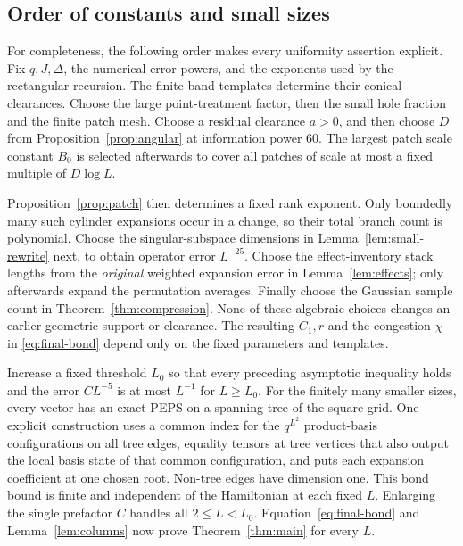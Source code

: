\subsection{Order of constants and small sizes}

For completeness, the following order makes every uniformity assertion
explicit. Fix $q,J,\Delta$, the numerical error powers, and the exponents
used by the rectangular recursion. The finite band templates determine
their conical clearances. Choose the large point-treatment factor, then
the small hole fraction and the finite patch mesh. Choose a residual
clearance $a>0$, and then choose $D$ from
Proposition~\ref{prop:angular} at information power $60$.
The largest patch scale constant $B_0$ is selected afterwards to cover
all patches of scale at most a fixed multiple of $D\log L$.

Proposition~\ref{prop:patch} then determines a fixed rank exponent.
Only boundedly many such cylinder expansions occur in a change, so their
total branch count is polynomial. Choose the singular-subspace dimensions
in Lemma~\ref{lem:small-rewrite} next, to obtain operator error
$L^{-25}$. Choose the effect-inventory stack lengths from the
\emph{original} weighted expansion error in Lemma~\ref{lem:effects};
only afterwards expand the permutation averages. Finally choose the
Gaussian sample count in Theorem~\ref{thm:compression}. None of these
algebraic choices changes an earlier geometric support or clearance.
The resulting $C_1,r$ and the congestion $\chi$ in
\eqref{eq:final-bond} depend only on the fixed parameters and templates.

Increase a fixed threshold $L_0$ so that every preceding asymptotic
inequality holds and the error $CL^{-5}$ is at most $L^{-1}$ for
$L\ge L_0$. For the finitely many smaller sizes, every vector has an exact
PEPS on a spanning tree of the square grid. One explicit construction
uses a common index for the $q^{L^2}$ product-basis configurations on all
tree edges, equality tensors at tree vertices that also output the local basis state
of that common configuration, and puts each expansion coefficient at one
chosen root. Non-tree edges have dimension one.
This bond bound is finite and independent of the Hamiltonian at each
fixed $L$. Enlarging the single prefactor $C$ handles all $2\le L<L_0$.
Equation~\eqref{eq:final-bond} and Lemma~\ref{lem:columns} now prove
Theorem~\ref{thm:main} for every $L$.
